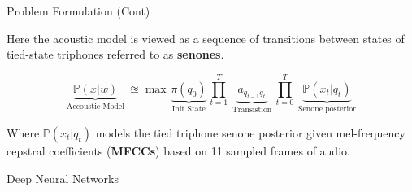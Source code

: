 \documentclass[notes]{beamer}
\newcommand{\cprob}[2]{ \prob{#1 \lvert #2} }
\newcommand{\prob}[1]{\mathbb{P}\left( #1 \right)}
\begin{document}
\begin{frame}{Problem Formulation (Cont)}
	\begin{center}
	Here the acoustic model is viewed as a sequence of transitions between states of tied-state triphones referred to as \textbf{senones}.
	\end{center}
	
	\vfill
	
	\begin{equation*}
	\underbrace{\cprob{x}{w}}_{\text{ Accoustic Model }} \approxeq \max \underbrace{\pi(q_0)}_{ \text{ Init State } } \prod_{t = 1}^T \underbrace{ a_{q_{t-1} q_t} }_{ \text{ Transistion } } \prod_{t=0}^T \underbrace{ \cprob{x_t}{q_t} }_{ \text{ Senone posterior } } 
	\label{eqn:lm:def}
	\end{equation*}
	
	\vfill
	
	\begin{center}
		Where $\cprob{x_t}{q_t}$ models the tied triphone senone posterior given mel-frequency cepstral coefficients (\textbf{MFCCs}) based on 11 sampled frames of audio.
	\end{center}
\end{frame}
	
\begin{frame}{Deep Neural Networks}
\end{frame}
\end{document}

